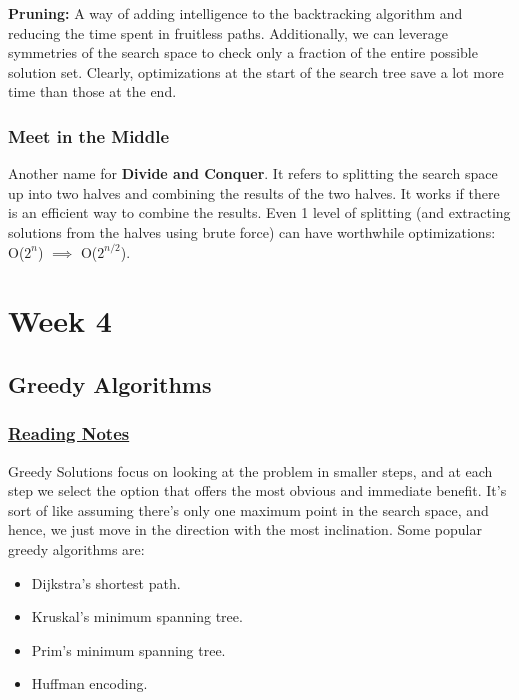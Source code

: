 \documentclass{article}
\begin{document}
\textbf{Pruning:} A way of adding intelligence to the backtracking algorithm and
reducing the time spent in fruitless paths. Additionally, we can leverage symmetries
of the search space to check only a fraction of the entire possible solution set. Clearly,
optimizations at the start of the search tree save a lot more time than those at the end.
\subsubsection*{Meet in the Middle}
Another name for \textbf{Divide and Conquer}. It refers to splitting the search space up
into two halves and combining the results of the two halves. It works if there is an
efficient way to combine the results. Even 1 level of splitting (and extracting solutions
from the halves using brute force) can have worthwhile optimizations: O($2^n$) $\implies$ O($2^{n/2}$).

\section{Week 4}
\subsection{Greedy Algorithms}
\subsubsection*{\href{https://leetcode.com/discuss/general-discussion/1061059/ABCs-of-Greedy}{Reading Notes}}
Greedy Solutions focus on looking at the problem in smaller steps, and at each step
we select the option that offers the most obvious and immediate benefit. It's sort
of like assuming there's only one maximum point in the search space, and hence,
we just move in the direction with the most inclination. Some popular greedy 
algorithms are:
\begin{itemize}
    \item Dijkstra's shortest path.
    \item Kruskal's minimum spanning tree.
    \item Prim's minimum spanning tree.
    \item Huffman encoding.
\end{itemize}


\end{document}
